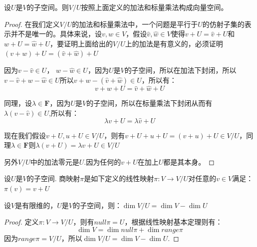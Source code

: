 \documentclass[10pt,a4paper,UTF8]{article}
\begin{document}
\begin{theorem}
设\(U\)是\(V\)的子空间。则\(V/U\)按照上面定义的加法和标量乘法构成向量空间。
\end{theorem}

\begin{proof}
在我们定义\(V/U\)的加法和标量乘法中，一个问题是平行于\(U\)的仿射子集的表示并不是唯一的。具体来说，设\(v,w\in V\)，假设\(\hat{v},\hat{w}\in V\)使得\(v+U = \hat{v} + U\)和\(w +U = \hat{w} + U\)，要证明上面给出的\(V/U\)上的加法是有意义的，必须证明\((v+w) + U = (\hat{v} + \hat{w}) + U\)

因为\(v-\hat{v}\in U\)， \(w- \hat{w} \in U\)，因为\(U\)是\(V\)的子空间，所以在加法下封闭，所以\(v- \hat{v} + w - \hat{w} \in U\)所以\(v + w - ( \hat{v} + \hat{w}) \in U\)，所以有：
\begin{equation}
\label{eq:7}
v + w + U = \hat{v} + \hat{w} + U
\end{equation}

同理，设\(\lambda \in \mathbf{F}\)，因为\(U\)是\(V\)的子空间，所以在标量乘法下封闭从而有\(\lambda (v - \hat{v})\in U\),所以有：
\begin{equation}
\label{eq:8}
\lambda v + U = \lambda \hat{v} + U
\end{equation}

现在我们假设\(v+U,u+U\in V/U\)，则有\(v+U + u + U = (v+u) + U\in V/U\)，同理\(\lambda \in \mathbf{F}\)则\(\lambda (v + U) = \lambda v + U \in V/U\)

另外\(V/U\)中的加法零元是\(U\).因为任何的\(v+U\)在加上\(U\)都是其本身。
\end{proof}

\begin{definition}
设\(U\)是\(V\)的子空间. 商映射\(\pi\)是如下定义的线性映射\(\pi :V\rightarrow V/U\)对任意的\(v\in V\)满足：\(\pi(v) = v+U\)
\end{definition}

\begin{theorem}
设\(V\)是有限维的，\(U\)是\(V\)的子空间，则：\(\dim V/U = \dim V - \dim U\)
\end{theorem}

\begin{proof}
定义\(\pi : V\rightarrow V/U\)，则有\(null\pi = U\)，根据线性映射基本定理则有：
\begin{equation}
\label{eq:9}
\dim V = \dim null\pi + \dim range \pi
\end{equation}
因为\(range\pi = V/U\)，所以\(\dim V/U = \dim V - \dim U\).
\end{proof}
\end{document}
